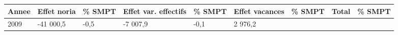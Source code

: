 \begin{longtable}[]{@{}lllllllll@{}}
\toprule
\begin{minipage}[b]{0.05\columnwidth}\raggedright
Annee\strut
\end{minipage} & \begin{minipage}[b]{0.10\columnwidth}\raggedright
Effet noria\strut
\end{minipage} & \begin{minipage}[b]{0.06\columnwidth}\raggedright
\% SMPT\strut
\end{minipage} & \begin{minipage}[b]{0.16\columnwidth}\raggedright
Effet var. effectifs\strut
\end{minipage} & \begin{minipage}[b]{0.06\columnwidth}\raggedright
\% SMPT\strut
\end{minipage} & \begin{minipage}[b]{0.12\columnwidth}\raggedright
Effet vacances\strut
\end{minipage} & \begin{minipage}[b]{0.06\columnwidth}\raggedright
\% SMPT\strut
\end{minipage} & \begin{minipage}[b]{0.09\columnwidth}\raggedright
Total\strut
\end{minipage} & \begin{minipage}[b]{0.06\columnwidth}\raggedright
\% SMPT\strut
\end{minipage}\tabularnewline
\midrule
\endhead
\begin{minipage}[t]{0.05\columnwidth}\raggedright
2009\strut
\end{minipage} & \begin{minipage}[t]{0.10\columnwidth}\raggedright
-41 000,5\strut
\end{minipage} & \begin{minipage}[t]{0.06\columnwidth}\raggedright
-0,5\strut
\end{minipage} & \begin{minipage}[t]{0.16\columnwidth}\raggedright
-7 007,9\strut
\end{minipage} & \begin{minipage}[t]{0.06\columnwidth}\raggedright
-0,1\strut
\end{minipage} & \begin{minipage}[t]{0.12\columnwidth}\raggedright
2 976,2\strut
\end{minipage} & \begin{minipage}[t]{0.06\columnwidth}\raggedright

\end{minipage}
\end{longtable}
